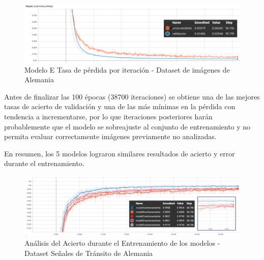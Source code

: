			\begin{figure}[H]
				\begin{center}
				\includegraphics[width=1\textwidth]{images/desarrollo/trainResults/german/model7Loss} 
				\end{center}
				\begin{center}
				\caption{\small{Modelo E Tasa de pérdida por iteración - Dataset de imágenes de Alemania}}
				
				{\small{\fontsize{10}{16.8}\selectfont {Fuente: Elaboración propia}}}
				\end{center}
				\vspace{-1.5em}
			\end{figure}
		
			Antes de finalizar las 100 épocas (38700 iteraciones) se obtiene una de las mejores tasas de acierto de validación y una de las más mínimas en la pérdida con tendencia a incrementarse, por lo que iteraciones posteriores harán probablemente que el modelo se sobreajuste al conjunto de entrenamiento y no permita evaluar correctamente imágenes previamente no analizadas.
		
		\vspace{2em}
		En resumen, los 5 modelos lograron similares resultados de acierto y error durante el entrenamiento.

			\begin{figure}[H]
				\includegraphics[width=1\textwidth, height=\textheight,keepaspectratio]{images/desarrollo/trainResults/germanSummary_entreAcierto} 
				\begin{center}
				\caption{\small{Análisis del Acierto durante el Entrenamiento de los modelos - Dataset Señales de Tránsito de Alemania}}
				
				{\small{\fontsize{10}{16.8}\selectfont {Fuente: Elaboración propia}}}
				\end{center}
				\vspace{-1.5em}
			\end{figure}	

